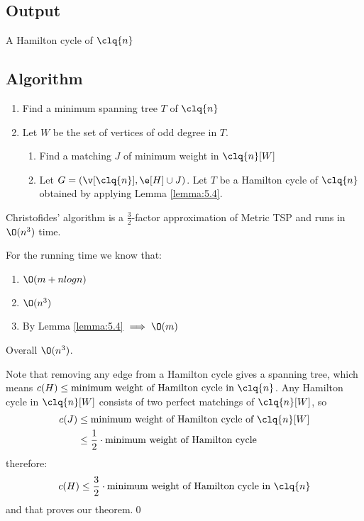 \subsection{Output}
    A Hamilton cycle of $\clq{n}$
\subsection{Algorithm}
\begin{enumerate}
    \item Find a minimum spanning tree $T$ of $\clq{n}$
    \item Let $W$ be the set of vertices of odd degree in $T$.
    \begin{enumerate}[label=\Alph*]
        \item Find a matching $J$ of minimum weight in $\clq{n}[W]$
        \item Let $G = (\v[\clq{n}], \e[H] \cup J)$. Let $T$ be a Hamilton cycle of $\clq{n}$ obtained by applying Lemma \ref{lemma:5.4}.
    \end{enumerate}
\end{enumerate}
\begin{customtheorem}{5.5}
\label{theorem:5.5}
    Christofides' algorithm is a $\frac{3}{2}$-factor approximation of Metric TSP and runs in $\O(n^3)$ time.
\end{customtheorem}
\begin{prf}
    For the running time we know that:
    \begin{enumerate}
        \item $\O(m + nlogn)$
        \item $\O(n^3)$
        \item By Lemma \ref{lemma:5.4} $\implies \O(m)$
    \end{enumerate}
    Overall $\O(n^3)$.

    Note that removing any edge from a Hamilton cycle gives a spanning tree, which means $c(H) \leq \text{minimum weight of Hamilton cycle in }\clq{n}$. Any Hamilton cycle in $\clq{n}[W]$ consists of two perfect matchings of $\clq{n}[W]$, so 
    \begin{align*}
        c(J) &\leq \text{minimum weight of Hamilton cycle of }\clq{n}[W]\\
             &\leq \frac{1}{2} \cdot \text{minimum weight of Hamilton cycle}
    \end{align*}
    therefore:
    \begin{equation*}
        c(H) \leq \frac{3}{2} \cdot \text{minimum weight of Hamilton cycle in } \clq{n}
    \end{equation*}
    and that proves our theorem.\qed
\end{prf}
